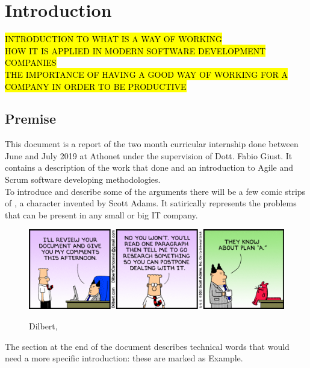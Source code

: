 \chapter{Introduction}
\label{introduction}

%
%
%
%

%

\hl{INTRODUCTION TO WHAT IS A WAY OF WORKING\\HOW IT IS APPLIED IN MODERN SOFTWARE DEVELOPMENT COMPANIES\\THE IMPORTANCE OF HAVING A GOOD WAY OF WORKING FOR A COMPANY IN ORDER TO BE PRODUCTIVE}

\section{Premise}
	This document is a report of the two month curricular internship done between June and July 2019 at Athonet under the supervision of Dott. Fabio Giust.
	It contains a description of the work that done and an introduction to Agile and Scrum software developing methodologies.\\
	To introduce and describe some of the arguments there will be a few comic strips of , a character invented by Scott Adams\cite{dilbert}.
	It satirically represents the problems that can be present in any small or big IT company.
	\begin{figure}[H]
		\centering
		\includegraphics[width=1\textwidth]{resources/Dissertate}\\
		\caption[Dilbert, ]{Dilbert, }
	\end{figure}
	The  section at the end of the document describes technical words that would need a more specific introduction: these are marked as \gls{Example}.\\
	
